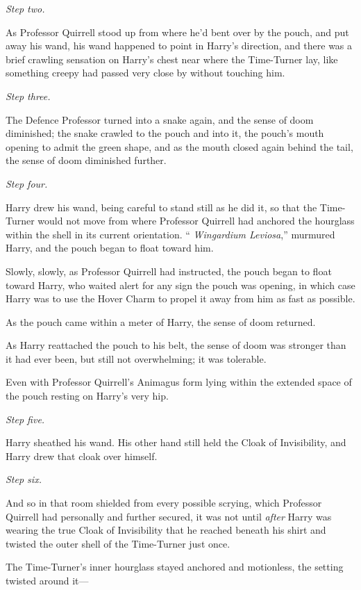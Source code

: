 \emph{Step two.}

As Professor Quirrell stood up from where he'd bent over by the pouch,
and put away his wand, his wand happened to point in Harry's direction,
and there was a brief crawling sensation on Harry's chest near where the
Time-Turner lay, like something creepy had passed very close by without
touching him.

\emph{Step three.}

The Defence Professor turned into a snake again, and the sense of doom
diminished; the snake crawled to the pouch and into it, the pouch's
mouth opening to admit the green shape, and as the mouth closed again
behind the tail, the sense of doom diminished further.

\emph{Step four.}

Harry drew his wand, being careful to stand still as he did it, so that
the Time-Turner would not move from where Professor Quirrell had
anchored the hourglass within the shell in its current orientation. ``
\emph{Wingardium Leviosa},'' murmured Harry, and the pouch began to
float toward him.

Slowly, slowly, as Professor Quirrell had instructed, the pouch began to
float toward Harry, who waited alert for any sign the pouch was opening,
in which case Harry was to use the Hover Charm to propel it away from
him as fast as possible.

As the pouch came within a meter of Harry, the sense of doom returned.

As Harry reattached the pouch to his belt, the sense of doom was
stronger than it had ever been, but still not overwhelming; it was
tolerable.

Even with Professor Quirrell's Animagus form lying within the extended
space of the pouch resting on Harry's very hip.

\emph{Step five.}

Harry sheathed his wand. His other hand still held the Cloak of
Invisibility, and Harry drew that cloak over himself.

\emph{Step six.}

And so in that room shielded from every possible scrying, which
Professor Quirrell had personally and further secured, it was not until
\emph{after} Harry was wearing the true Cloak of Invisibility that he
reached beneath his shirt and twisted the outer shell of the Time-Turner
just once.

The Time-Turner's inner hourglass stayed anchored and motionless, the
setting twisted around it---

